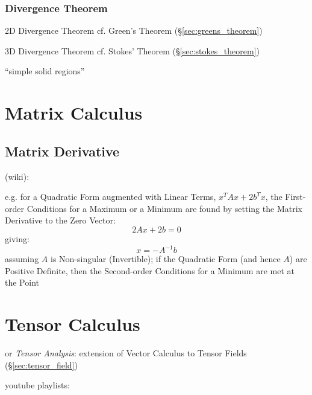 {\subsubsection{Divergence Theorem}\label{sec:divergence_theorem}

2D Divergence Theorem \fist cf. Green's Theorem (\S\ref{sec:greens_theorem})

3D Divergence Theorem \fist cf. Stokes' Theorem (\S\ref{sec:stokes_theorem})

``simple solid regions''



\section{Matrix Calculus}\label{sec:matrix_calculus}

\subsection{Matrix Derivative}\label{sec:matrix_derivative}

(wiki):

e.g. for a Quadratic Form augmented with Linear Terms, $x^TAx + 2b^Tx$, the
First-order Conditions for a Maximum or a Minimum are found by setting the
Matrix Derivative to the Zero Vector:
\[
  2Ax + 2b = 0
\]
giving:
\[
  x = -A^{-1}b
\]
assuming $A$ is Non-singular (Invertible); if the Quadratic Form (and hence
$A$) are Positive Definite, then the Second-order Conditions for a
Minimum are met at the Point



\section{Tensor Calculus}\label{sec:tensor_calculus}

or \emph{Tensor Analysis}: extension of Vector Calculus to Tensor Fields
(\S\ref{sec:tensor_field})

youtube playlists:

}
